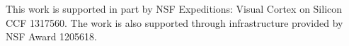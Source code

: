 \label{sec:acknowledgements}
This work is supported in part by NSF Expeditions: Visual Cortex on Silicon CCF 1317560. The work is also supported through infrastructure provided by NSF Award 1205618.
